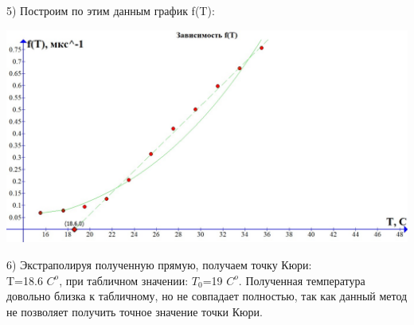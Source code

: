 \documentclass[a4paper,12pt]{article} %
\begin{document}
5) Построим по этим данным график f(T): \\
\begin{flushleft}


\includegraphics[scale=0.29]{3421}


\end{flushleft}

6) Экстраполируя полученную прямую, получаем точку Кюри: \\
T=18.6 $C^{o}$, при табличном значении: $T_0$=19 $C^{o}$. Полученная температура довольно близка к табличному, но не совпадает полностью, так как данный метод не позволяет получить точное значение точки Кюри.
\end{document}
